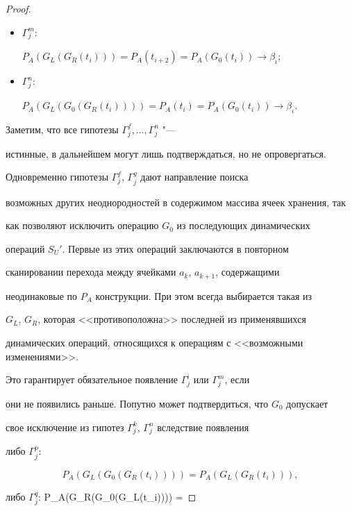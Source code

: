 \begin{proof}
\begin{itemize}

\item[--]

$\Gamma^{m}_{j}$:

$P_{A}(G_{L}(G_{R}(t_{i}))) =

P_{A}(t_{i+2})=P_{A}(G_{0}(t_{i})) \to \beta_{\iota}$; 

\item[--] $\Gamma^{n}_{j}$:

$P_{A}(G_{L}(G_{0}(G_{R}(t_{i}))))=P_{A}(t_{i})=P_{A}(G_{0}(t_{i})) \to

\beta_{\iota}$.



\end{itemize} 



 Заметим, что все гипотезы $\Gamma^{f}_{j},\ldots, \Gamma^{n}_{j}$ "---

истинные, в дальнейшем могут лишь подтверждаться, но не опровергаться.

Одновременно гипотезы $\Gamma ^{f}_{j}$, $\Gamma^{g}_{j}$ дают направление поиска

возможных других неоднородностей в содержимом массива ячеек хранения, так

как позволяют исключить операцию $G_{0 }$ из последующих динамических

операций $S_{U}'$. Первые из этих операций заключаются в повторном

сканировании перехода между ячейками $a_{k}$, $a_{k+1}$, содержащими

неодинаковые по $P_{A}$ конструкции. При этом всегда выбирается такая из

$G_{L}$, $G_{R}$, которая <<противоположна>> последней из применявшихся

динамических операций, относящихся к операциям с <<возможными изменениями>>.

Это гарантирует обязательное появление $\Gamma^{i}_{j}$ или $\Gamma^{m}_{j}$, если

они не появились раньше. Попутно может подтвердиться, что $G_{0}$ допускает

свое исключение из гипотез $\Gamma^{k}_{j}$, $\Gamma^{n}_{j}$ вследствие появления

либо $\Gamma^{p}_{j}$:

$$P_{A}(G_{L}(G_{0}(G_{R}(t_{i}))))=P_{A}(G_{L}(G_{R}(t_{i}))),$$

либо $\Gamma^{q}_{j}$: $$P_{A}(G_{R}(G_{0}(G_{L}(t_{i})))) =


\end{proof}
